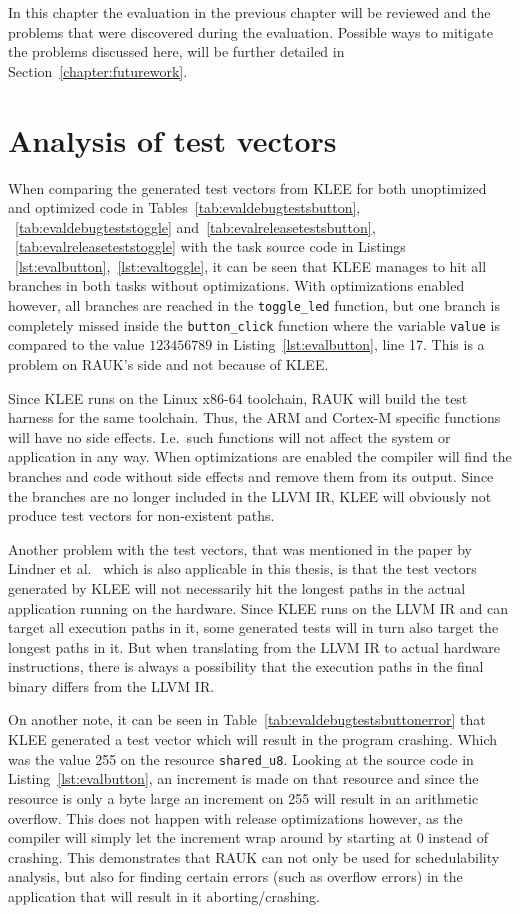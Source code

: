 In this chapter the evaluation in the previous chapter will be reviewed
and the problems that were discovered during the evaluation. Possible
ways to mitigate the problems discussed here, will be further detailed in
Section~\ref{chapter:futurework}.

\section{Analysis of test vectors}
When comparing the generated test vectors from KLEE for both unoptimized and
optimized code in Tables~\ref{tab:evaldebugtestsbutton},
~\ref{tab:evaldebugteststoggle} and~\ref{tab:evalreleasetestsbutton},
~\ref{tab:evalreleaseteststoggle} with the task source code in Listings
~\ref{lst:evalbutton},~\ref{lst:evaltoggle}, it can be seen that KLEE manages to
hit all branches in both tasks without optimizations. With optimizations
enabled however, all branches are reached in the \texttt{toggle\_led} function,
but one branch is completely missed inside the \texttt{button\_click} function
where the variable \texttt{value} is compared to the value $123456789$ in
Listing~\ref{lst:evalbutton}, line 17. This is a problem on RAUK's side and not
because of KLEE.

Since KLEE runs on the Linux x86-64 toolchain, RAUK will build the test harness
for the same toolchain. Thus, the ARM and Cortex-M specific functions will have
no side effects. I.e.\ such functions will not affect the system or application
in any way. When optimizations are enabled the compiler will find the branches
and code without side effects and remove them from its output. Since the
branches are no longer included in the LLVM IR, KLEE will obviously not
produce test vectors for non-existent paths.

Another problem with the test vectors, that was mentioned in the paper by
Lindner et al.\ \cite{lindner} which is also applicable in this thesis, is that
the test vectors generated by KLEE will not necessarily hit the longest paths
in the actual application running on the hardware. Since KLEE runs on the LLVM
IR and can target all execution paths in it, some generated tests will
in turn also target the longest paths in it. But when translating from the LLVM
IR to actual hardware instructions, there is always a possibility that the
execution paths in the final binary differs from the LLVM IR\@.

On another note, it can be seen in Table~\ref{tab:evaldebugtestsbuttonerror}
that KLEE generated a test vector which will result in the program crashing.
Which was the value 255 on the resource \texttt{shared\_u8}. Looking at the
source code in Listing~\ref{lst:evalbutton}, an increment is made on that
resource and since the resource is only a byte large an increment on 255 will
result in an arithmetic overflow. This does not happen with release
optimizations however, as the compiler will simply let the increment wrap
around by starting at 0 instead of crashing. This demonstrates that RAUK
can not only be used for schedulability analysis, but also for finding
certain errors (such as overflow errors) in the application that will result
in it aborting/crashing.

